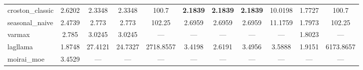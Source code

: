 \begin{table}
\begin{adjustbox}{width=0.95\textheight,center}
\begin{tabular}{lcccccccccc}
croston\_classic & 2.6202 & 2.3348 & 2.3348 & 100.7 & \textbf{2.1839} & \textbf{2.1839} & \textbf{2.1839} & 10.0198 & 1.7727 & 100.7 \\
seasonal\_naive & 2.4739 & 2.773 & 2.773 & 102.25 & 2.6959 & 2.6959 & 2.6959 & 11.1759 & 1.7973 & 102.25 \\
varmax & 2.785 & 3.0245 & 3.0245 & --- & --- & --- & --- & --- & 1.8023 & --- \\
lagllama & 1.8748 & 27.4121 & 24.7327 & 2718.8557 & 3.4198 & 2.6191 & 3.4956 & 3.5888 & 1.9151 & 6173.8657 \\
moirai\_moe & 3.4529 & --- & --- & --- & --- & --- & --- & --- & --- & --- \\
\bottomrule
\end{tabular}
\end{adjustbox}
\end{table}

